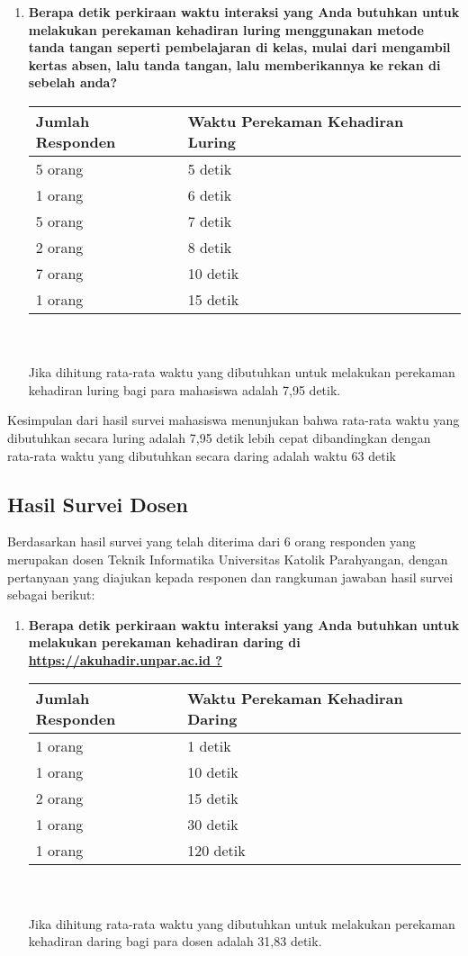 \documentclass[a4paper,twoside]{article}
\begin{document}
\begin{enumerate}
\begin{enumerate}
			\item \textbf{Berapa detik perkiraan waktu interaksi yang Anda butuhkan untuk melakukan perekaman kehadiran luring menggunakan metode tanda tangan seperti pembelajaran di kelas, mulai dari mengambil kertas absen, lalu tanda tangan, lalu memberikannya ke rekan di sebelah anda?}\\
			\begin{tabular}{|p{4cm} |p{7cm}|}
				\hline
				Jumlah Responden &  Waktu Perekaman Kehadiran Luring \\ \hline     
				5 orang &  5 detik\\ \hline 
				1 orang &  6 detik\\ \hline 
				5 orang &  7 detik\\ \hline 
				2 orang &  8 detik\\ \hline 
				7 orang &  10 detik\\ \hline 
				1 orang &  15 detik\\ \hline
			\end{tabular}\\ \\
			Jika dihitung rata-rata waktu yang dibutuhkan untuk melakukan perekaman kehadiran luring bagi para mahasiswa adalah 7,95 detik.
		\end{enumerate}
		Kesimpulan dari hasil survei mahasiswa menunjukan bahwa rata-rata waktu yang dibutuhkan secara luring adalah 7,95 detik lebih cepat dibandingkan dengan rata-rata waktu yang dibutuhkan secara daring adalah waktu 63 detik
		
		\subsection{Hasil Survei Dosen}
		Berdasarkan hasil survei yang telah diterima dari 6 orang responden yang merupakan dosen Teknik Informatika Universitas Katolik Parahyangan, dengan pertanyaan yang diajukan kepada responen dan rangkuman jawaban hasil survei sebagai berikut:
		\begin{enumerate}
			\item \textbf{Berapa detik perkiraan waktu interaksi yang Anda butuhkan untuk melakukan perekaman kehadiran daring di \url{https://akuhadir.unpar.ac.id ?}}\\
			\begin{tabular}{|p{4cm} |p{7cm}|}
				\hline
				Jumlah Responden &  Waktu Perekaman Kehadiran Daring \\ \hline     
				1 orang &  1 detik\\ \hline 
				1 orang &  10 detik\\ \hline 
				2 orang &  15 detik\\ \hline 
				1 orang &  30 detik\\ \hline 
				1 orang &  120 detik\\ \hline 
			\end{tabular}\\ \\
			Jika dihitung rata-rata waktu yang dibutuhkan untuk melakukan perekaman kehadiran daring bagi para dosen adalah 31,83 detik.
		

\end{enumerate}
\end{enumerate}
\end{document}
